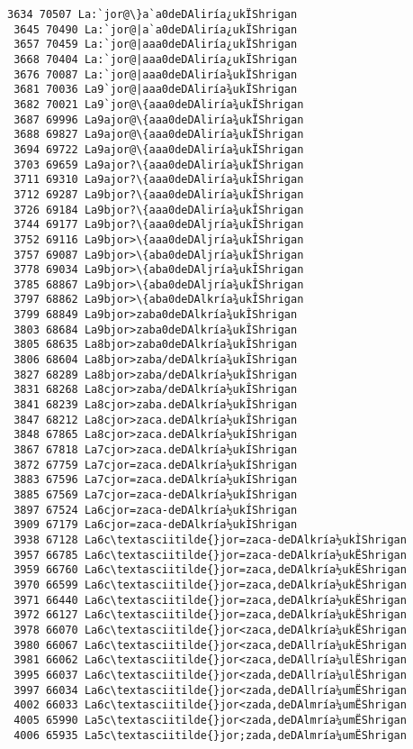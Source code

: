 \documentclass[11pt]{article}
\begin{document}
\begin{Verbatim}[commandchars=\\\{\}]
 3634 70507 La:`jor@\}a`a0deDAliría¿ukÏShrigan
 3645 70490 La:`jor@|a`a0deDAliría¿ukÏShrigan
 3657 70459 La:`jor@|aaa0deDAliría¿ukÏShrigan
 3668 70404 La:`jor@|aaa0deDAliría¿ukÏShrigan
 3676 70087 La:`jor@|aaa0deDAliría¾ukÏShrigan
 3681 70036 La9`jor@|aaa0deDAliría¾ukÏShrigan
 3682 70021 La9`jor@\{aaa0deDAliría¾ukÏShrigan
 3687 69996 La9ajor@\{aaa0deDAliría¾ukÏShrigan
 3688 69827 La9ajor@\{aaa0deDAliría¾ukÏShrigan
 3694 69722 La9ajor@\{aaa0deDAliría¾ukÏShrigan
 3703 69659 La9ajor?\{aaa0deDAliría¾ukÏShrigan
 3711 69310 La9ajor?\{aaa0deDAliría¾ukÎShrigan
 3712 69287 La9bjor?\{aaa0deDAliría¾ukÎShrigan
 3726 69184 La9bjor?\{aaa0deDAliría¾ukÎShrigan
 3744 69177 La9bjor?\{aaa0deDAljría¾ukÎShrigan
 3752 69116 La9bjor>\{aaa0deDAljría¾ukÎShrigan
 3757 69087 La9bjor>\{aba0deDAljría¾ukÎShrigan
 3778 69034 La9bjor>\{aba0deDAljría¾ukÎShrigan
 3785 68867 La9bjor>\{aba0deDAljría¾ukÎShrigan
 3797 68862 La9bjor>\{aba0deDAlkría¾ukÎShrigan
 3799 68849 La9bjor>zaba0deDAlkría¾ukÎShrigan
 3803 68684 La9bjor>zaba0deDAlkría¾ukÎShrigan
 3805 68635 La8bjor>zaba0deDAlkría¾ukÎShrigan
 3806 68604 La8bjor>zaba/deDAlkría¾ukÎShrigan
 3827 68289 La8bjor>zaba/deDAlkría½ukÎShrigan
 3831 68268 La8cjor>zaba/deDAlkría½ukÎShrigan
 3841 68239 La8cjor>zaba.deDAlkría½ukÎShrigan
 3847 68212 La8cjor>zaca.deDAlkría½ukÎShrigan
 3848 67865 La8cjor>zaca.deDAlkría½ukÍShrigan
 3867 67818 La7cjor>zaca.deDAlkría½ukÍShrigan
 3872 67759 La7cjor=zaca.deDAlkría½ukÍShrigan
 3883 67596 La7cjor=zaca.deDAlkría½ukÍShrigan
 3885 67569 La7cjor=zaca-deDAlkría½ukÍShrigan
 3897 67524 La6cjor=zaca-deDAlkría½ukÍShrigan
 3909 67179 La6cjor=zaca-deDAlkría½ukÌShrigan
 3938 67128 La6c\textasciitilde{}jor=zaca-deDAlkría½ukÌShrigan
 3957 66785 La6c\textasciitilde{}jor=zaca-deDAlkría½ukËShrigan
 3959 66760 La6c\textasciitilde{}jor=zaca,deDAlkría½ukËShrigan
 3970 66599 La6c\textasciitilde{}jor=zaca,deDAlkría½ukËShrigan
 3971 66440 La6c\textasciitilde{}jor=zaca,deDAlkría½ukËShrigan
 3972 66127 La6c\textasciitilde{}jor=zaca,deDAlkría¼ukËShrigan
 3978 66070 La6c\textasciitilde{}jor<zaca,deDAlkría¼ukËShrigan
 3980 66067 La6c\textasciitilde{}jor<zaca,deDAllría¼ukËShrigan
 3981 66062 La6c\textasciitilde{}jor<zaca,deDAllría¼ulËShrigan
 3995 66037 La6c\textasciitilde{}jor<zada,deDAllría¼ulËShrigan
 3997 66034 La6c\textasciitilde{}jor<zada,deDAllría¼umËShrigan
 4002 66033 La6c\textasciitilde{}jor<zada,deDAlmría¼umËShrigan
 4005 65990 La5c\textasciitilde{}jor<zada,deDAlmría¼umËShrigan
 4006 65935 La5c\textasciitilde{}jor;zada,deDAlmría¼umËShrigan

\end{Verbatim}
\end{document}
